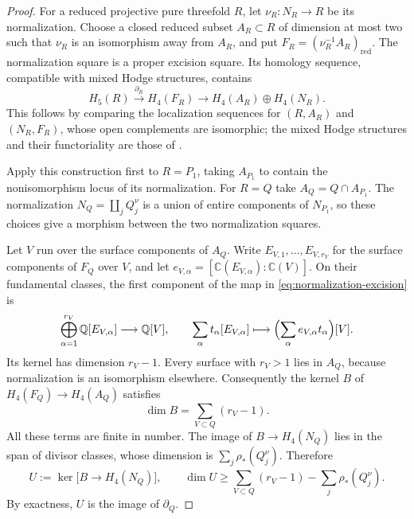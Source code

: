\begin{proof}
For a reduced projective pure threefold $R$, let
$\nu_R\colon N_R\to R$ be its normalization.  Choose a closed reduced
subset $A_R\subset R$ of dimension at most two such that $\nu_R$ is an
isomorphism away from $A_R$, and put
$F_R=(\nu_R^{-1}A_R)_{\mathrm{red}}$.  The normalization square is a
proper excision square.  Its homology sequence, compatible with mixed
Hodge structures, contains
\begin{equation}\label{eq:normalization-excision}
 H_5(R)\xrightarrow{\partial_R} H_4(F_R)
 \longrightarrow H_4(A_R)\oplus H_4(N_R).
\end{equation}
This follows by comparing the localization sequences for
$(R,A_R)$ and $(N_R,F_R)$, whose open complements are isomorphic;
the mixed Hodge structures and their functoriality are those of
\cite[Proposition~8.2.2 and Proposition~8.3.9]{Deligne1974}.

Apply this construction first to $R=P_1$, taking $A_{P_1}$ to contain
the nonisomorphism locus of its normalization.  For $R=Q$ take
$A_Q=Q\cap A_{P_1}$.  The normalization $N_Q=\coprod_j Q_j^\nu$ is a
union of entire components of $N_{P_1}$, so these choices give a
morphism between the two normalization squares.

Let $V$ run over the surface components of $A_Q$.  Write
$E_{V,1},\ldots,E_{V,r_V}$ for the surface components of $F_Q$ over
$V$, and let $e_{V,\alpha}=[\mathbb C(E_{V,\alpha}):\mathbb C(V)]$.
On their fundamental classes, the first component of the map in
\eqref{eq:normalization-excision} is
\[
 \bigoplus_{\alpha=1}^{r_V}\mathbb Q[E_{V,\alpha}]
 \longrightarrow \mathbb Q[V],\qquad
 \sum_\alpha t_\alpha[E_{V,\alpha}]
 \longmapsto \Bigl(\sum_\alpha e_{V,\alpha}t_\alpha\Bigr)[V].
\]
Its kernel has dimension $r_V-1$.  Every surface with $r_V>1$ lies
in $A_Q$, because normalization is an isomorphism elsewhere.
Consequently the kernel $B$ of $H_4(F_Q)\to H_4(A_Q)$ satisfies
\[
 \dim B=\sum_{V\subset Q}(r_V-1).
\]
All these terms are finite in number.  The image of
$B\to H_4(N_Q)$ lies in the span of divisor classes, whose dimension
is $\sum_j\rho_*(Q_j^\nu)$.  Therefore
\[
 U:=\ker\bigl[B\longrightarrow H_4(N_Q)\bigr],\qquad
 \dim U\geq\sum_{V\subset Q}(r_V-1)-\sum_j\rho_*(Q_j^\nu).
\]
By exactness, $U$ is the image of $\partial_Q$.


\end{proof}
